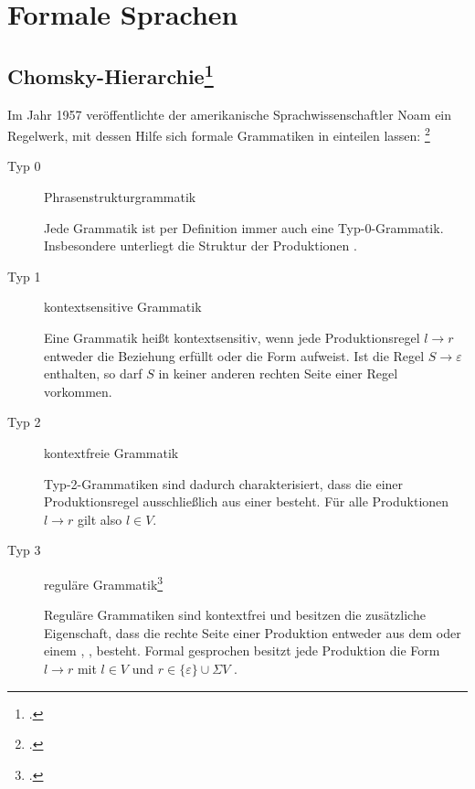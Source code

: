 \documentclass{lehramt-informatik-haupt}
\begin{document}
\chapter{Formale Sprachen}

\section{Chomsky-Hierarchie\footcite{wiki:chomsky}}

Im Jahr 1957 veröffentlichte der amerikanische Sprachwissenschaftler
Noam  ein Regelwerk, mit dessen Hilfe sich formale
Grammatiken in  einteilen lassen:
\footcite[Seite 168]{hoffmann}

\begin{description}
\item[Typ 0] Phrasenstrukturgrammatik

Jede Grammatik ist per Definition immer auch eine Typ-0-Grammatik.
Insbesondere unterliegt die Struktur der Produktionen .

\item[Typ 1] kontextsensitive Grammatik

Eine Grammatik heißt kontextsensitiv, wenn jede Produktionsregel $l
\rightarrow r$ entweder die Beziehung  erfüllt
oder die Form  aufweist. Ist die Regel
$S \rightarrow \varepsilon$ enthalten, so darf $S$ in keiner anderen
rechten Seite einer Regel vorkommen.

\item[Typ 2] kontextfreie Grammatik

Typ-2-Grammatiken sind dadurch charakterisiert, dass die  einer Produktionsregel ausschließlich aus einer  besteht. Für alle Produktionen $l \rightarrow r$ gilt also $l
\in V$.

\item[Typ 3] reguläre Grammatik\footcite[Seite 14]{theo:fs:1}

Reguläre Grammatiken sind kontextfrei und besitzen die zusätzliche
Eigenschaft, dass die rechte Seite einer Produktion entweder aus dem
 oder einem ,
, besteht. Formal gesprochen
besitzt jede Produktion die Form $l \rightarrow r$ mit $l \in V$ und $r
\in \{ \varepsilon \} \cup \Sigma V$ .
\end{description}
\end{document}

